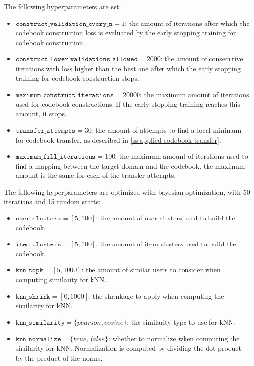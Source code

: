 The following hyperparameters are set:
\begin{itemize}
\item $\texttt{construct\_validation\_every\_n} = 1$: the amount of iterations after which the codebook construction loss is evaluated by the early stopping training for codebook construction.
\item $\texttt{construct\_lower\_validations\_allowed} = 2000$: the amount of consecutive iterations with loss higher than the best one after which the early stopping training for codebook construction stops.
\item $\texttt{maximum\_construct\_iterations} = 20000$: the maximum amount of iterations used for codebook constructions. If the early stopping training reaches this amount, it stops.
\item $\texttt{transfer\_attempts} = 30$: the amount of attempts to find a local minimum for codebook transfer, as described in \autoref{ss:applied-codebook-transfer}.
\item $\texttt{maximum\_fill\_iterations} = 100$: the maximum amount of iterations used to find a mapping between the target domain and the codebook. the maximum amount is the same for each of the transfer attempts.
\end{itemize}
The following hyperparameters are optimized with bayesian optimization, with 50 iterations and 15 random starts:
\begin{itemize}
\item $\texttt{user\_clusters} = [5,100]$: the amount of user clusters used to build the codebook.
\item $\texttt{item\_clusters} = [5,100]$: the amount of item clusters used to build the codebook.
\item $\texttt{knn\_topk} = [5,1000]$: the amount of similar users to consider when computing similarity for kNN.
\item $\texttt{knn\_shrink} = [0,1000]$: the shrinkage to apply when computing the similarity for kNN.
\item $\texttt{knn\_similarity} = \{pearson,cosine\}$: the similarity type to use for kNN.
\item $\texttt{knn\_normalize} = \{true,false\}$: whether to normalize when computing the similarity for kNN. Normalization is computed by dividing the dot product by the product of the norms.
\end{itemize}


